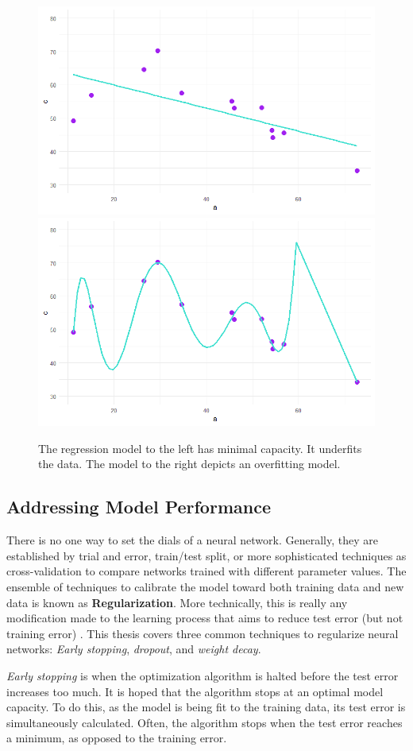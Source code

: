 
\begin{figure}[H]
    \includegraphics[width=0.5\linewidth]{Figures/underfit.png}
    \includegraphics[width=0.5\linewidth]{Figures/overfit.png}
    \vspace{-20pt}
    \caption{\footnotesize{The regression model to the left has minimal capacity.  It underfits the data. The model to the right depicts an overfitting model.}}
    \label{capacityviz}
\end{figure}


\subsection{Addressing Model Performance}

There is no one way to set the dials of a neural network.  Generally, they are established by trial and error, train/test split, or more sophisticated techniques as cross-validation to compare networks trained with different parameter values. \cite{mackay1992practical}  The ensemble of techniques to calibrate the model toward both training data and new data is known as \textbf{Regularization}.  More technically, this is really any modification made to the learning process that aims to reduce test error (but not training error) \cite{Goodfellow-et-al-2016}.  This thesis covers three common techniques to regularize neural networks: \textit{Early stopping}, \textit{dropout}, and \textit{weight decay}.

\textit{Early stopping} is when the optimization algorithm is halted before the test error increases too much.  It is hoped that the algorithm stops at an optimal model capacity. To do this, as the model is being fit to the training data, its test error is simultaneously calculated. 
 Often, the algorithm stops when the test error reaches a minimum, as opposed to the training error. \cite{doan2004generalization}

